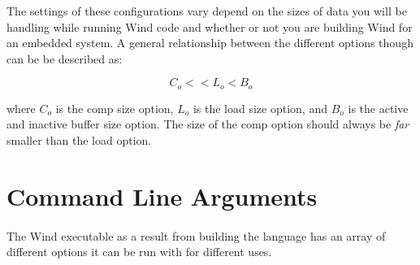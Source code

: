 \par The settings of these configurations vary depend on the sizes of data you will be handling while running Wind code and whether or not you are building Wind for an embedded system. A general relationship between the different options though can be be described as:

$$
C_o << L_o < B_o
$$

where $C_o$ is the comp size option, $L_o$ is the load size option, and $B_o$ is the active and inactive buffer size option. The size of the comp option should always be \emph{far} smaller than the load option.

\section{Command Line Arguments}

\paragraph{  } The Wind executable as a result from building the language has an array of different options it can be run with for different uses.


